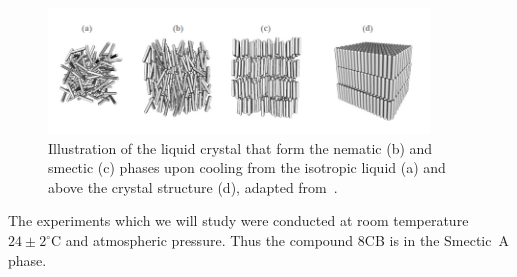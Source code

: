 \begin{figure}[tbh]
\centerline{\includegraphics[width =0.9\textwidth]{./figures/Pictures/liquid_crystal.png}}
\caption{Illustration of the liquid crystal that form the nematic (b) and smectic (c) phases upon cooling from the isotropic liquid (a) and above the crystal structure (d), adapted from~\cite{book2012liquid}.}
\label{smectic}
\end{figure}

The experiments which we will study  were conducted at room temperature $24\pm 2^{\circ}$C and atmospheric pressure. Thus the compound 8CB is in the Smectic~A phase.

